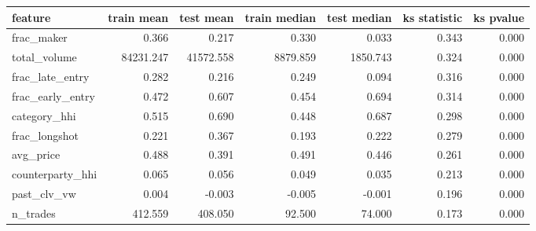 \begin{tabular}{lrrrrrr}
\toprule
feature & train mean & test mean & train median & test median & ks statistic & ks pvalue \\
\midrule
frac\_maker & 0.366 & 0.217 & 0.330 & 0.033 & 0.343 & 0.000 \\
total\_volume & 84231.247 & 41572.558 & 8879.859 & 1850.743 & 0.324 & 0.000 \\
frac\_late\_entry & 0.282 & 0.216 & 0.249 & 0.094 & 0.316 & 0.000 \\
frac\_early\_entry & 0.472 & 0.607 & 0.454 & 0.694 & 0.314 & 0.000 \\
category\_hhi & 0.515 & 0.690 & 0.448 & 0.687 & 0.298 & 0.000 \\
frac\_longshot & 0.221 & 0.367 & 0.193 & 0.222 & 0.279 & 0.000 \\
avg\_price & 0.488 & 0.391 & 0.491 & 0.446 & 0.261 & 0.000 \\
counterparty\_hhi & 0.065 & 0.056 & 0.049 & 0.035 & 0.213 & 0.000 \\
past\_clv\_vw & 0.004 & -0.003 & -0.005 & -0.001 & 0.196 & 0.000 \\
n\_trades & 412.559 & 408.050 & 92.500 & 74.000 & 0.173 & 0.000 \\
\bottomrule
\end{tabular}
